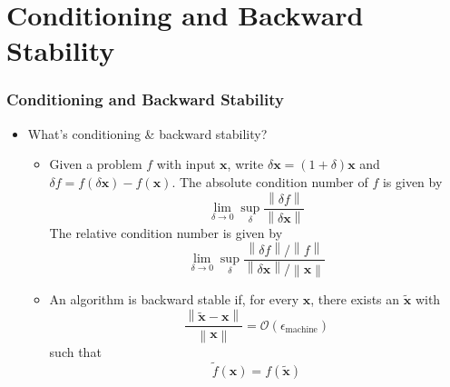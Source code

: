 \documentclass[10pt]{beamer}
\newcommand{\norm}[1]{\left\lVert#1\right\rVert}
\renewcommand{\vec}[1]{\boldsymbol{#1}}
\newcommand{\bigO}[1]{\mathcal{O}\left(#1\right)}
\newcommand{\perturb}[1]{\tilde{#1}}
\newcommand{\epsmach}{\epsilon_{\text{machine}}}
\newcommand{\subitem}[1]{\begin{itemize}\item #1\end{itemize}}
\begin{document}
\section{Conditioning and Backward Stability}
\begin{frame}
  \frametitle{Conditioning and Backward Stability}
  \begin{itemize}[<+->]
    \item What’s conditioning \& backward stability?
    \subitem{Given a problem \(f\) with input \(\vec{x}\), write \(\delta \vec{x} = (1 + \delta)\vec{x}\) and \(\delta f=f\left(\delta \vec{x}\right) - f(\vec{x})\). The \alert{absolute condition number} of \(f\) is given by \[\lim_{\delta\to0}\sup_{\delta}\frac{\norm{\delta f}}{\norm{\delta \vec{x}}}\] The \alert{relative condition number} is given by \[\lim_{\delta\to0}\sup_{\delta}\frac{\norm{\delta f}/\norm{f}}{\norm{\delta \vec{x}}/\norm{\vec{x}}}\]\vspace{-4.5mm}}
    \subitem{An algorithm is \alert{backward stable} if, for every \(\vec{x}\), there exists an \(\perturb{\vec{x}}\) with \[\frac{\norm{\perturb{\vec{x}} - \vec{x}}}{\norm{\vec{x}}}=\bigO{\epsmach}\] such that \[\perturb{f}(\vec{x}) = f(\perturb{\vec{x}})\]\vspace{-4.5mm}}
  \end{itemize}
\end{frame}
\end{document}

